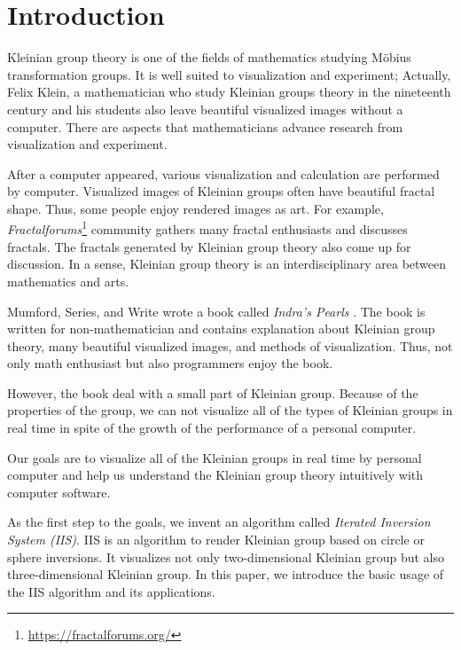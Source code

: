 

\section{Introduction}

Kleinian group theory is one of the fields of mathematics studying 
M\"obius transformation groups.
It is well suited to visualization and experiment;
Actually, Felix Klein, a mathematician who study Kleinian groups theory
in the nineteenth century and his students also leave beautiful visualized images
without a computer.
There are aspects that mathematicians advance research from
visualization and experiment.

After a computer appeared, various visualization and calculation are
performed by computer.
Visualized images of Kleinian groups often have beautiful fractal shape.
Thus, some people enjoy rendered images as art.
For example,
\textit{Fractalforums}\footnote{\url{https://fractalforums.org/}}
community gathers many fractal enthusiasts and discusses fractals.
The fractals generated by Kleinian group theory also come up for
discussion.
In a sense, Kleinian group theory is an interdisciplinary area between
mathematics and arts.

Mumford, Series, and Write wrote a book called
\textit{Indra's Pearls} \cite{MumfordSeriesWright200204}.
The book is written for non-mathematician and contains explanation
about Kleinian group theory, many beautiful visualized images, and
methods of visualization.
Thus, not only math enthusiast but also programmers enjoy the book.

However, the book deal with a small part of Kleinian group.
Because of the properties of the group, we can not
visualize all of the types of Kleinian groups in real time
in spite of the growth of the performance of a personal computer.

Our goals are to visualize all of the Kleinian groups in real time by
personal computer and help us understand the Kleinian group theory
intuitively with computer software.

As the first step to the goals, we invent an algorithm called
\textit{Iterated Inversion System (IIS)}.
IIS is an algorithm to render Kleinian group based on circle or sphere
inversions.
It visualizes not only two-dimensional Kleinian group but also
three-dimensional Kleinian group.
In this paper, we introduce the basic usage of the IIS algorithm and its
applications.
